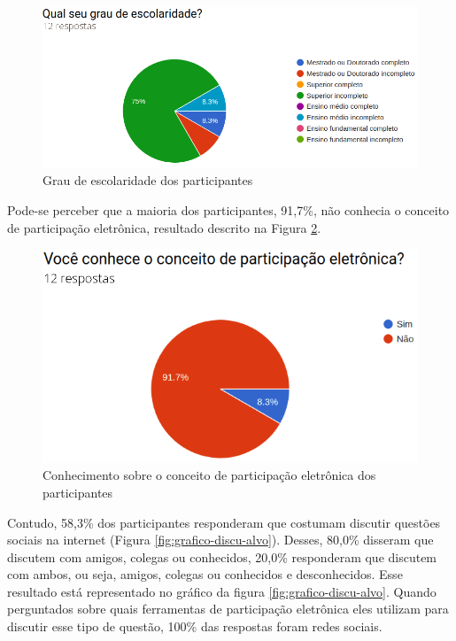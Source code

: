\begin{figure}[!ht]
    \centering
    \includegraphics[scale=0.4]{./figuras/grau_escolaridade.png}
    \caption{Grau de escolaridade dos participantes}
    \label{fig:grafico-grau}
\end{figure}

\par
Pode-se perceber que a maioria dos participantes, 91,7\%, não conhecia o conceito de participação eletrônica, resultado descrito na Figura \ref{fig:grafico-participacao}.

\begin{figure}[!ht]
    \centering
    \includegraphics[scale=0.4]{./figuras/conhece_participacao_eletronica.png}
    \caption{Conhecimento sobre o conceito de participação eletrônica dos participantes}
    \label{fig:grafico-participacao}
\end{figure}

\par
Contudo, 58,3\% dos participantes responderam que costumam discutir questões sociais na internet (Figura \ref{fig:grafico-discu-alvo}). 
Desses, 80,0\% disseram que  discutem com amigos, colegas ou conhecidos, 20,0\%  responderam que discutem com ambos, ou seja, amigos, colegas ou conhecidos e desconhecidos. Esse resultado está representado no gráfico da figura \ref{fig:grafico-discu-alvo}. Quando perguntados sobre quais ferramentas de participação 
eletrônica eles utilizam para discutir esse tipo de questão, 100\% das respostas foram redes sociais. 

